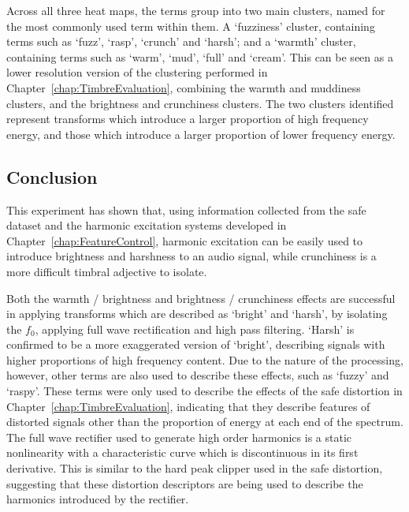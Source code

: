 			Across all three heat maps, the terms group into two main clusters, named for the most commonly
			used term within them. A `fuzziness' cluster, containing terms such as `fuzz', `rasp', `crunch' and
			`harsh'; and a `warmth' cluster, containing terms such as `warm', `mud', `full' and `cream'. This
			can be seen as a lower resolution version of the clustering performed in
			Chapter~\ref{chap:TimbreEvaluation}, combining the warmth and muddiness clusters, and the
			brightness and crunchiness clusters. The two clusters identified represent transforms which
			introduce a larger proportion of high frequency energy, and those which introduce a larger
			proportion of lower frequency energy.

	\subsection{Conclusion}
	\label{sec:PerceptualExperiments-SemanticControl-Conclusion}
		This experiment has shown that, using information collected from the \acrshort{safe} dataset and the
		harmonic excitation systems developed in Chapter~\ref{chap:FeatureControl}, harmonic excitation can be
		easily used to introduce brightness and harshness to an audio signal, while crunchiness is a more difficult
		timbral adjective to isolate.

		Both the warmth / brightness and brightness / crunchiness effects are successful in applying transforms
		which are described as `bright' and `harsh', by isolating the $f_{0}$, applying full wave rectification and
		high pass filtering. `Harsh' is confirmed to be a more exaggerated version of `bright', describing signals
		with higher proportions of high frequency content. Due to the nature of the processing, however, other
		terms are also used to describe these effects, such as `fuzzy' and `raspy'. These terms were only used to
		describe the effects of the \acrshort{safe} distortion in Chapter~\ref{chap:TimbreEvaluation}, indicating
		that they describe features of distorted signals other than the proportion of energy at each end of the
		spectrum. The full wave rectifier used to generate high order harmonics is a static nonlinearity with a
		characteristic curve which is discontinuous in its first derivative. This is similar to the hard peak
		clipper used in the \acrshort{safe} distortion, suggesting that these distortion descriptors are being used
		to describe the harmonics introduced by the rectifier.

